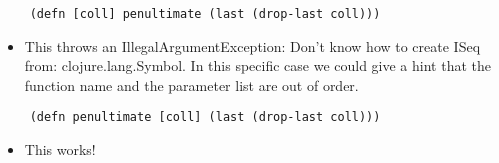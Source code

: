 \documentclass[12pt]{article}
\begin{document}
\begin{verbatim}
	(defn [coll] penultimate (last (drop-last coll)))
\end{verbatim}
\begin{itemize}
	\item This throws an IllegalArgumentException: Don't know how to create ISeq from: clojure.lang.Symbol. In this specific case we could give a hint that the function name and the parameter list are out of order.
\end{itemize}

\begin{verbatim}
	(defn penultimate [coll] (last (drop-last coll)))
\end{verbatim}
\begin{itemize}
	\item This works!
\end{itemize}

\end{document}
